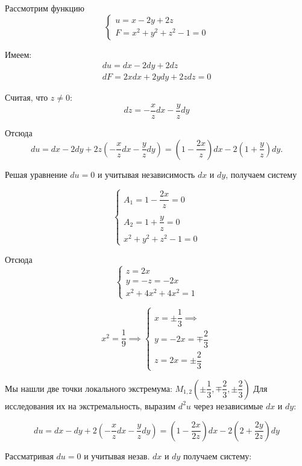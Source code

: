 \documentclass[../../main.tex]{subfiles}
\begin{document}
	\begin{example}
	\;
	
	Рассмотрим функцию 
	\[ \begin{cases}
	u = x - 2y + 2z \\
	F = x^2 + y^2 + z^2 -1 = 0
	\end{cases} \]
	
	Имеем:
	\[\begin{array}{l}
	du = dx - 2dy + 2dz \\
	dF = 2xdx + 2ydy + 2zdz = 0
	\end{array}\]
	
	Считая, что $z \ne 0$:
	\[dz = -\dfrac{x}{z}dx - \dfrac{y}{z}dy\]
	
	Отсюда
	\[du = dx - 2dy + 2z\left( -\dfrac{x}{z}dx - 
	\dfrac{y}{z} dy \right) = 
	\left( 1 - \dfrac{2x}{z} \right)dx - 
	2\left( 1 + \dfrac{y}{z} \right)dy.\]
	
	Решая уравнение $du = 0$ и учитывая независимость $dx$ и $dy$,
	получаем систему
	
	\[
	\begin{cases}
	A_1 = 1 - \dfrac{2x}{z} = 0 \\
    \\
	A_2 = 1 + \dfrac{y}{z} = 0 \\
	x^2 + y^2 + z^2 - 1 = 0
	\end{cases} 
	\]
	
	Отсюда
	\[ \begin{cases}
	z = 2x \\
	y = -z = -2x \\
	x^2 + 4x^2 + 4x^2 = 1
	\end{cases} \]
	
	\[x^2 = \dfrac{1}{9} \implies
	 \begin{cases}
        x = \pm \dfrac{1}{3} \implies \\
        y = -2x = \mp \dfrac{2}{3} \\
        z = 2x = \pm \dfrac{2}{3}
	 \end{cases}
	\]
 
	Мы нашли две точки локального экстремума: $M_{1,2} 
	\left( \pm \dfrac{1}{3}, \mp \dfrac{2}{3}, 
	\pm \dfrac{2}{3} \right)$ Для исследования их на 
	экстремальность, выразим $d^2 u$ через
	независимые $dx$ и $dy$:

	\[du = dx - dy + 2\left(-\dfrac{x}{z} dx - \dfrac{y}{z}dy\right) = 
	\left(1 - \dfrac{2x}{2z}\right)dx - 2\left(2 + \dfrac{2y}{2z}\right)dy\]
	
	Рассматривая $du = 0$ и учитывая незав. $dx$ и $dy$ получаем систему:
	

\end{example}
\end{document}
